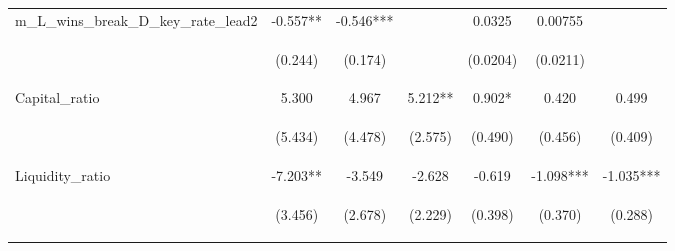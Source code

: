 \begin{tabular}{lcccccc}
m\_L\_wins\_break\_D\_key\_rate\_lead2 & -0.557** & -0.546*** &  & 0.0325 & 0.00755 &  \\
\vspace{4pt} & \begin{footnotesize}(0.244)\end{footnotesize} & \begin{footnotesize}(0.174)\end{footnotesize} & \begin{footnotesize}\end{footnotesize} & \begin{footnotesize}(0.0204)\end{footnotesize} & \begin{footnotesize}(0.0211)\end{footnotesize} & \begin{footnotesize}\end{footnotesize} \\
Capital\_ratio & 5.300 & 4.967 & 5.212** & 0.902* & 0.420 & 0.499 \\
\vspace{4pt} & \begin{footnotesize}(5.434)\end{footnotesize} & \begin{footnotesize}(4.478)\end{footnotesize} & \begin{footnotesize}(2.575)\end{footnotesize} & \begin{footnotesize}(0.490)\end{footnotesize} & \begin{footnotesize}(0.456)\end{footnotesize} & \begin{footnotesize}(0.409)\end{footnotesize} \\
Liquidity\_ratio & -7.203** & -3.549 & -2.628 & -0.619 & -1.098*** & -1.035*** \\
\vspace{4pt} & \begin{footnotesize}(3.456)\end{footnotesize} & \begin{footnotesize}(2.678)\end{footnotesize} & \begin{footnotesize}(2.229)\end{footnotesize} & \begin{footnotesize}(0.398)\end{footnotesize} & \begin{footnotesize}(0.370)\end{footnotesize} & \begin{footnotesize}(0.288)\end{footnotesize} \\

\end{tabular}
